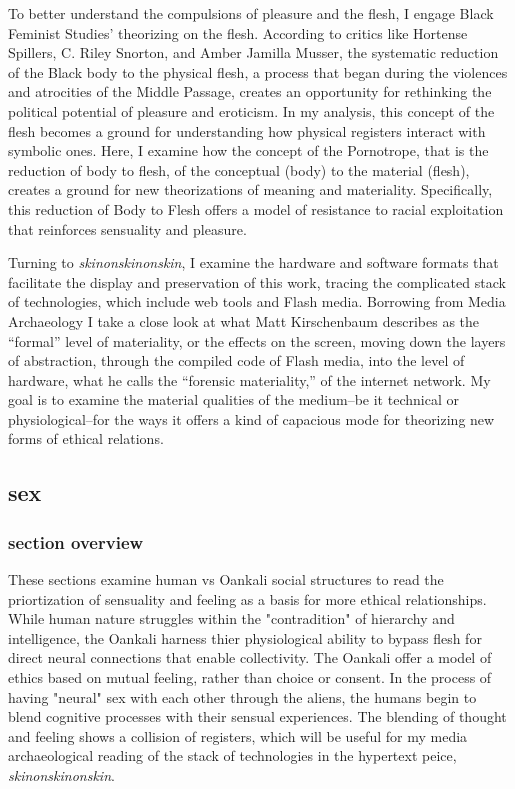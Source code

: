 \documentclass[11pt]{article}
\begin{document}
To better understand the compulsions of pleasure and the flesh, I
engage Black Feminist Studies’ theorizing on the flesh. According to
critics like Hortense Spillers, C. Riley Snorton, and Amber Jamilla
Musser, the systematic reduction of the Black body to the physical
flesh, a process that began during the violences and atrocities of the
Middle Passage, creates an opportunity for rethinking the political
potential of pleasure and eroticism. In my analysis, this concept of
the flesh becomes a ground for understanding how physical registers
interact with symbolic ones. Here, I examine how the concept of the
Pornotrope, that is the reduction of body to flesh, of the conceptual
(body) to the material (flesh), creates a ground for new theorizations
of meaning and materiality. Specifically, this reduction of Body to
Flesh offers a model of resistance to racial exploitation that
reinforces sensuality and pleasure.

Turning to \emph{skinonskinonskin}, I examine the hardware and software
formats that facilitate the display and preservation of this work,
tracing the complicated stack of technologies, which include web tools
and Flash media. Borrowing from Media Archaeology I take a close look
at what Matt Kirschenbaum describes as the “formal” level of
materiality, or the effects on the screen, moving down the layers of
abstraction, through the compiled code of Flash media, into the level
of hardware, what he calls the “forensic materiality,” of the internet
network. My goal is to examine the material qualities of the
medium--be it technical or physiological--for the ways it offers a
kind of capacious mode for theorizing new forms of ethical relations.


\subsection{sex}
\label{sec:org5e870a2}
\subsubsection{section overview}
\label{sec:org733aefc}
These sections examine human vs Oankali social structures to read the
priortization of sensuality and feeling as a basis for more ethical
relationships. While human nature struggles within the "contradition"
of hierarchy and intelligence, the Oankali harness thier physiological
ability to bypass flesh for direct neural connections that enable
collectivity. The Oankali offer a model of ethics based on mutual
feeling, rather than choice or consent. In the process of having
"neural" sex with each other through the aliens, the humans begin to
blend cognitive processes with their sensual experiences. The blending
of thought and feeling shows a collision of registers, which will be
useful for my media archaeological reading of the stack of
technologies in the hypertext peice, \emph{skinonskinonskin}.
\end{document}
